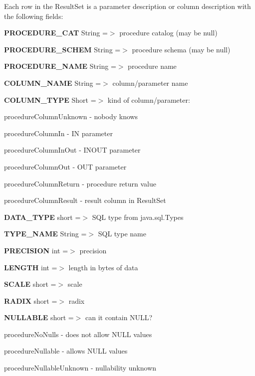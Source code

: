 Each row in the Result\+Set is a parameter description or column description with the following fields\+: 
\begin{DoxyEnumerate}
\item {\bfseries P\+R\+O\+C\+E\+D\+U\+R\+E\+\_\+\+C\+AT} String =$>$ procedure catalog (may be null) 
\item {\bfseries P\+R\+O\+C\+E\+D\+U\+R\+E\+\_\+\+S\+C\+H\+EM} String =$>$ procedure schema (may be null) 
\item {\bfseries P\+R\+O\+C\+E\+D\+U\+R\+E\+\_\+\+N\+A\+ME} String =$>$ procedure name 
\item {\bfseries C\+O\+L\+U\+M\+N\+\_\+\+N\+A\+ME} String =$>$ column/parameter name 
\item {\bfseries C\+O\+L\+U\+M\+N\+\_\+\+T\+Y\+PE} Short =$>$ kind of column/parameter\+: 
\begin{DoxyItemize}
\item procedure\+Column\+Unknown -\/ nobody knows 
\item procedure\+Column\+In -\/ IN parameter 
\item procedure\+Column\+In\+Out -\/ I\+N\+O\+UT parameter 
\item procedure\+Column\+Out -\/ O\+UT parameter 
\item procedure\+Column\+Return -\/ procedure return value 
\item procedure\+Column\+Result -\/ result column in Result\+Set 
\end{DoxyItemize}
\item {\bfseries D\+A\+T\+A\+\_\+\+T\+Y\+PE} short =$>$ S\+QL type from java.\+sql.\+Types 
\item {\bfseries T\+Y\+P\+E\+\_\+\+N\+A\+ME} String =$>$ S\+QL type name 
\item {\bfseries P\+R\+E\+C\+I\+S\+I\+ON} int =$>$ precision 
\item {\bfseries L\+E\+N\+G\+TH} int =$>$ length in bytes of data 
\item {\bfseries S\+C\+A\+LE} short =$>$ scale 
\item {\bfseries R\+A\+D\+IX} short =$>$ radix 
\item {\bfseries N\+U\+L\+L\+A\+B\+LE} short =$>$ can it contain N\+U\+LL? 
\begin{DoxyItemize}
\item procedure\+No\+Nulls -\/ does not allow N\+U\+LL values 
\item procedure\+Nullable -\/ allows N\+U\+LL values 
\item procedure\+Nullable\+Unknown -\/ nullability unknown 

\end{DoxyItemize}
\end{DoxyEnumerate}
